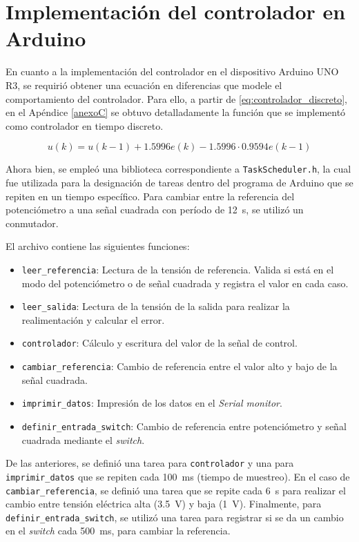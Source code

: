 \section{Implementación del controlador en Arduino}

En cuanto a la implementación del controlador en el dispositivo Arduino UNO R3, se requirió obtener una ecuación en diferencias que modele el comportamiento del controlador.
Para ello, a partir de \eqref{eq:controlador_discreto}, en el Apéndice \ref{anexoC} se obtuvo detalladamente la función que se implementó como controlador en tiempo discreto.

\begin{equation} \label{eq:ecuacion_diferencias}
    u(k) = u(k-1) + 1.5996 e(k) - 1.5996 \cdot 0.9594 e(k-1)
\end{equation}

Ahora bien, se empleó una biblioteca correspondiente a \texttt{TaskScheduler.h}, la cual fue utilizada para la designación de tareas dentro del programa de Arduino que se repiten en un tiempo específico.
Para cambiar entre la referencia del potenciómetro a una señal cuadrada con período de \SI{12}{\second}, se utilizó un conmutador.\cite{b3}

El archivo contiene las siguientes funciones:
\begin{itemize}
    \item \texttt{leer\_referencia}: Lectura de la tensión de referencia. Valida si está en el modo del potenciómetro o de señal cuadrada y registra el valor en cada caso.
    \item \texttt{leer\_salida}: Lectura de la tensión de la salida para realizar la realimentación y calcular el error.
    \item \texttt{controlador}: Cálculo y escritura del valor de la señal de control.
    \item \texttt{cambiar\_referencia}: Cambio de referencia entre el valor alto y bajo de la señal cuadrada.
    \item \texttt{imprimir\_datos}: Impresión de los datos en el \textit{Serial monitor}.
    \item \texttt{definir\_entrada\_switch}: Cambio de referencia entre potenciómetro y señal cuadrada mediante el \textit{switch}.
\end{itemize}

De las anteriores, se definió una tarea para \texttt{controlador} y una para \texttt{imprimir\_datos} que se repiten cada \SI{100}{\milli\second} (tiempo de muestreo).
En el caso de \texttt{cambiar\_referencia}, se definió una tarea que se repite cada \SI{6}{\second} para realizar el cambio entre tensión eléctrica alta (\SI{3.5}{\volt}) y baja (\SI{1}{\volt}).
Finalmente, para \texttt{definir\_entrada\_switch}, se utilizó una tarea para registrar si se da un cambio en el \textit{switch} cada \SI{500}{\milli\second}, para cambiar la referencia.

